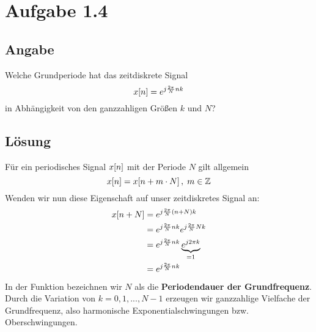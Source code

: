 \section*{Aufgabe 1.4}

\subsection*{Angabe}
 
Welche Grundperiode hat das zeitdiskrete Signal
\[
	x\negthinspace\left[n\right]=e^{j\frac{2\pi}{N}nk}
\]
in Abhängigkeit von den ganzzahligen Größen $k$ und $N$?

\subsection*{Lösung}
Für ein periodisches Signal $x\negthinspace\left[n\right]$ mit der Periode $N$ gilt allgemein
\[
	x\negthinspace\left[n\right]=x\negthinspace\left[n+m\cdot N\right], \; m\in \mathbb{Z}
\]
Wenden wir nun diese Eigenschaft auf unser zeitdiskretes Signal an:
\begin{align*}
	x\negthinspace\left[n+N\right] &= e^{j\frac{2\pi}{N}(n+N)k}\\
	&= e^{j\frac{2\pi}{N}nk}e^{j\frac{2\pi}{N}Nk}\\
	&= e^{j\frac{2\pi}{N}nk}\underbrace{e^{j2\pi k}}_{=1}\\
	&= e^{j\frac{2\pi}{N}nk}
\end{align*}
In der Funktion bezeichnen wir $N$ als die \textbf{Periodendauer der Grundfrequenz}. Durch die Variation von $k=0,1,...,N-1$ erzeugen wir ganzzahlige Vielfache der Grundfrequenz, also harmonische Exponentialschwingungen bzw. Oberschwingungen.